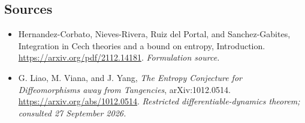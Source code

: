 \documentclass[11pt]{article}
\begin{document}
\subsection{Sources}
\begin{itemize}
\item[S1]Hernandez-Corbato, Nieves-Rivera, Ruiz del Portal, and Sanchez-Gabites, Integration in Cech theories and a bound on entropy, Introduction.
\url{https://arxiv.org/pdf/2112.14181}.
\textit{Formulation source.}
\item[E1]G. Liao, M. Viana, and J. Yang, \emph{The Entropy Conjecture for Diffeomorphisms away from Tangencies}, arXiv:1012.0514.
\url{https://arxiv.org/abs/1012.0514}.
\textit{Restricted differentiable-dynamics theorem; consulted 27 September 2026.}
\end{itemize}
\end{document}
